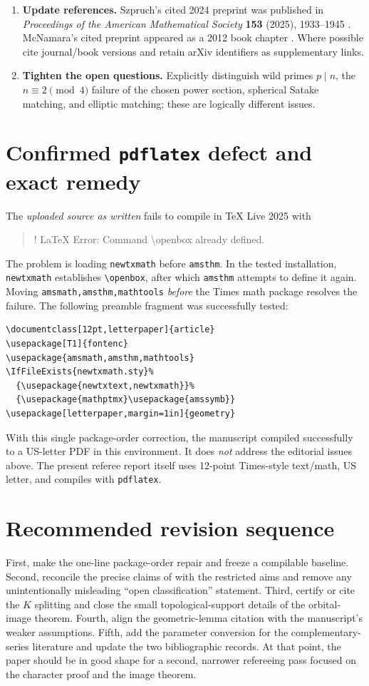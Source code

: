 \documentclass[12pt,letterpaper]{article}
\begin{document}
\begin{enumerate}[label=\textbf{E\arabic*.}]
\item \textbf{Update references.} Szpruch's cited 2024 preprint was published in \emph{Proceedings of the American Mathematical Society} \textbf{153} (2025), 1933--1945 \cite{Sz25}. McNamara's cited preprint appeared as a 2012 book chapter \cite{Mc12}. Where possible cite journal/book versions and retain arXiv identifiers as supplementary links.
\item \textbf{Tighten the open questions.} Explicitly distinguish wild primes $p\mid n$, the $n\equiv2\pmod4$ failure of the chosen power section, spherical Satake matching, and elliptic matching; these are logically different issues.
\end{enumerate}

\section{Confirmed \texttt{pdflatex} defect and exact remedy}

The \emph{uploaded source as written} fails to compile in TeX Live 2025 with
\begin{quote}\ttfamily\small
! LaTeX Error: Command \textbackslash openbox already defined.
\end{quote}
The problem is loading \texttt{newtxmath} before \texttt{amsthm}. In the tested installation, \texttt{newtxmath} establishes \verb|\openbox|, after which \texttt{amsthm} attempts to define it again. Moving \texttt{amsmath,amsthm,mathtools} \emph{before} the Times math package resolves the failure. The following preamble fragment was successfully tested:
\begin{verbatim}
\documentclass[12pt,letterpaper]{article}
\usepackage[T1]{fontenc}
\usepackage{amsmath,amsthm,mathtools}
\IfFileExists{newtxmath.sty}%
  {\usepackage{newtxtext,newtxmath}}%
  {\usepackage{mathptmx}\usepackage{amssymb}}
\usepackage[letterpaper,margin=1in]{geometry}
\end{verbatim}
With this single package-order correction, the manuscript compiled successfully to a US-letter PDF in this environment. It does \emph{not} address the editorial issues above. The present referee report itself uses 12-point Times-style text/math, US letter, and compiles with \texttt{pdflatex}.

\section{Recommended revision sequence}

First, make the one-line package-order repair and freeze a compilable baseline. Second, reconcile the precise claims of \cite{Jo01} with the restricted aims and remove any unintentionally misleading ``open classification'' statement. Third, certify or cite the $K$ splitting and close the small topological-support details of the orbital-image theorem. Fourth, align the geometric-lemma citation with the manuscript's weaker assumptions. Fifth, add the parameter conversion for the complementary-series literature and update the two bibliographic records. At that point, the paper should be in good shape for a second, narrower refereeing pass focused on the character proof and the image theorem.
\end{document}
